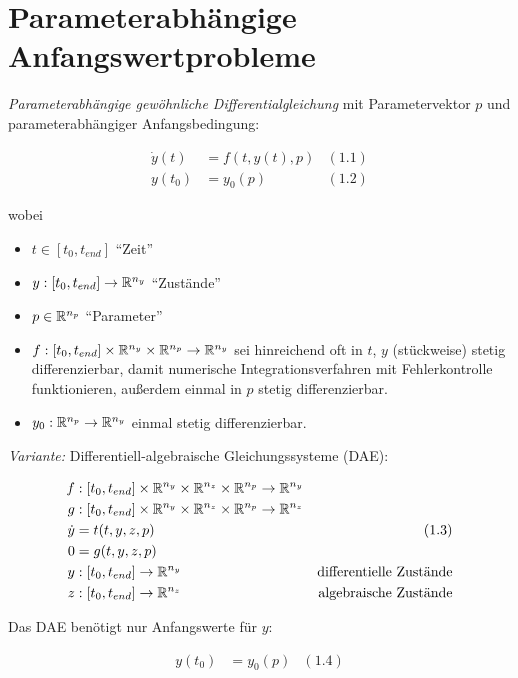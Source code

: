 \chapter{Parameterabhängige Anfangswertprobleme}

\emph{Parameterabhängige gewöhnliche Differentialgleichung} mit Parametervektor $p$ und parameterabhängiger Anfangsbedingung:

\begin{align*}
\dot y(t) &= f(t,y(t),p) & (1.1) \\
y(t_0) &= y_0(p) & (1.2)
\end{align*}

wobei

\begin{itemize}
\item $t \in [t_0,t_{end}]$ "`Zeit"'
\item $y: [t_0,t_{end}] \to \mathbb{R}^{n_y}$ "`Zustände"'
\item $p \in \mathbb{R}^{n_p}$ "`Parameter"'
\item $f: [t_0,t_{end}] \times \mathbb{R}^{n_y} \times \mathbb{R}^{n_p} \to \mathbb{R}^{n_y}$ sei hinreichend oft in $t$, $y$ (stückweise) stetig differenzierbar, damit numerische Integrationsverfahren mit Fehlerkontrolle funktionieren, außerdem einmal in $p$ stetig differenzierbar.
\item $y_0: \mathbb{R}^{n_p} \to \mathbb{R}^{n_y}$ einmal stetig differenzierbar.
\end{itemize}

\emph{Variante: } Differentiell-algebraische Gleichungssysteme (DAE):

\begin{align*}
f&: [t_0,t_{end}] \times \mathbb{R}^{n_y} \times \mathbb{R}^{n_z} \times \mathbb{R}^{n_p} \to \mathbb{R}^{n_y} & \\
g&: [t_0,t_{end}] \times \mathbb{R}^{n_y} \times \mathbb{R}^{n_z} \times \mathbb{R}^{n_p} \to \mathbb{R}^{n_z} & \\
\dot y &= t(t,y,z,p) & (1.3)\\
0 &= g(t,y,z,p) \\
y &: [t_0,t_{end}] \to \mathbb{R}^{n_y} & \text{differentielle Zustände} \\
z &: [t_0,t_{end}] \to \mathbb{R}^{n_z} & \text{algebraische Zustände} \\
\end{align*}

Das DAE benötigt nur Anfangswerte für $y$:

\begin{align*}
y(t_0) &= y_0(p) & (1.4)
\end{align*}

